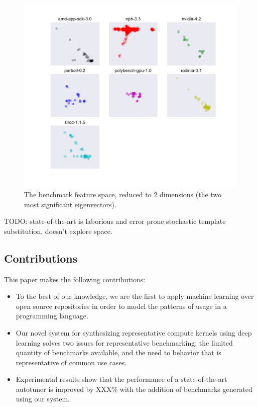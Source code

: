 \documentclass[preprint,nonatbib,10pt,nocopyrightspace]{sigplanconf}
\begin{document}
\begin{figure}%
  \includegraphics[width=\columnwidth]{img/pca-suites}
  \caption{%
    The benchmark feature space, reduced to 2 dimensions (the two most
    significant eigenvectors).%
  }
  \label{fig:pca-benchmarks}
\end{figure}

TODO: state-of-the-art is laborious and error prone stochastic
template substitution, doesn't explore space.


\subsection{Contributions}

This paper makes the following contributions:%
\begin{itemize}
\item To the best of our knowledge, we are the first to apply machine
  learning over open source repositories in order to model the
  patterns of usage in a programming language.
\item Our novel system for synthesizing representative compute kernels
  using deep learning solves two issues for representative
  benchmarking: the limited quantity of benchmarks available, and the
  need to behavior that is representative of common use cases.
\item Experimental results show that the performance of a
  state-of-the-art autotuner is improved by XXX\% with the addition of
  benchmarks generated using our system.
\end{itemize}
\end{document}
